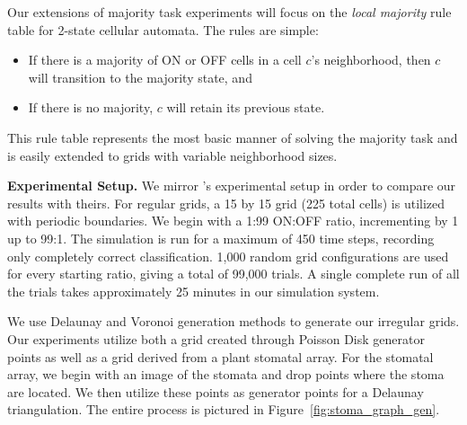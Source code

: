 \documentclass[a4paper,11pt]{article}
\begin{document}
Our extensions of majority task experiments will focus on the \textit{local majority} rule table for 2-state cellular automata. The rules are simple:

\begin{itemize}
\item If there is a majority of ON or OFF cells in a cell $c$'s neighborhood, then $c$ will transition to the majority state, and
\item If there is no majority, $c$ will retain its previous state.
\end{itemize}

\noindent This rule table represents the most basic manner of solving the majority task and is easily extended to grids with variable neighborhood sizes.

\medskip

\noindent \textbf{Experimental Setup.} We mirror \citeauthor{me07}'s experimental setup in order to compare our results with theirs. For regular grids, a 15 by 15 grid (225 total cells) is utilized with periodic boundaries. We begin with a 1:99 ON:OFF ratio, incrementing by 1 up to 99:1. The simulation is run for a maximum of 450 time steps, recording only completely correct classification. 1,000 random grid configurations are used for every starting ratio, giving a total of 99,000 trials. A single complete run of all the trials takes approximately 25 minutes in our simulation system.

We use Delaunay and Voronoi generation methods to generate our irregular grids. Our experiments utilize both a grid created through Poisson Disk generator points as well as a grid derived from a plant stomatal array. For the stomatal array, we begin with an image of the stomata and drop points where the stoma are located. We then utilize these points as generator points for a Delaunay triangulation. The entire process is pictured in Figure~\ref{fig:stoma_graph_gen}.

\end{document}
